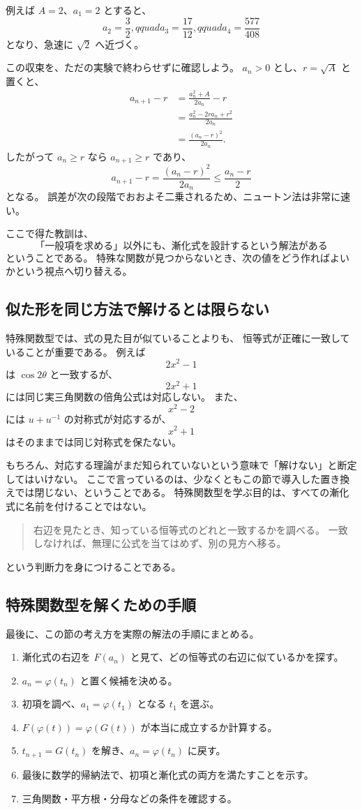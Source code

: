 例えば $A=2$、$a_1=2$ とすると、
\[
  a_2=\frac32,qquad
  a_3=\frac{17}{12},qquad
  a_4=\frac{577}{408}
\]
となり、急速に $\sqrt2$ へ近づく。

この収束を、ただの実験で終わらせずに確認しよう。
$a_n>0$ とし、$r=\sqrt A$ と置くと、
\begin{align}
  a_{n+1}-r
    &=\frac{a_n^2+A}{2a_n}-r\\
    &=\frac{a_n^2-2ra_n+r^2}{2a_n}\\
    &=\frac{(a_n-r)^2}{2a_n}.
  \tag{2.7.15}
\end{align}
したがって $a_n\geq r$ なら $a_{n+1}\geq r$ であり、
\[
  a_{n+1}-r
    =\frac{(a_n-r)^2}{2a_n}
    \leq \frac{a_n-r}{2}
\]
となる。
誤差が次の段階でおおよそ二乗されるため、ニュートン法は非常に速い。

ここで得た教訓は、
\[
  \text{「一般項を求める」以外にも、漸化式を設計するという解法がある}
\]
ということである。
特殊な関数が見つからないとき、次の値をどう作ればよいかという視点へ切り替える。

\subsection{似た形を同じ方法で解けるとは限らない}

特殊関数型では、式の見た目が似ていることよりも、
恒等式が正確に一致していることが重要である。
例えば
\[
  2x^2-1
\]
は $\cos 2\theta$ と一致するが、
\[
  2x^2+1
\]
には同じ実三角関数の倍角公式は対応しない。
また、
\[
  x^2-2
\]
には $u+u^{-1}$ の対称式が対応するが、
\[
  x^2+1
\]
はそのままでは同じ対称式を保たない。

もちろん、対応する理論がまだ知られていないという意味で「解けない」と断定してはいけない。
ここで言っているのは、少なくともこの節で導入した置き換えでは閉じない、ということである。
特殊関数型を学ぶ目的は、すべての漸化式に名前を付けることではない。
\begin{quote}
  右辺を見たとき、知っている恒等式のどれと一致するかを調べる。
  一致しなければ、無理に公式を当てはめず、別の見方へ移る。
\end{quote}
という判断力を身につけることである。

\subsection{特殊関数型を解くための手順}

最後に、この節の考え方を実際の解法の手順にまとめる。
\begin{enumerate}
  \item 漸化式の右辺を $F(a_n)$ と見て、どの恒等式の右辺に似ているかを探す。
  \item $a_n=\varphi(t_n)$ と置く候補を決める。
  \item 初項を調べ、$a_1=\varphi(t_1)$ となる $t_1$ を選ぶ。
  \item $F(\varphi(t))=\varphi(G(t))$ が本当に成立するか計算する。
  \item $t_{n+1}=G(t_n)$ を解き、$a_n=\varphi(t_n)$ に戻す。
  \item 最後に数学的帰納法で、初項と漸化式の両方を満たすことを示す。
  \item 三角関数・平方根・分母などの条件を確認する。
\end{enumerate}

